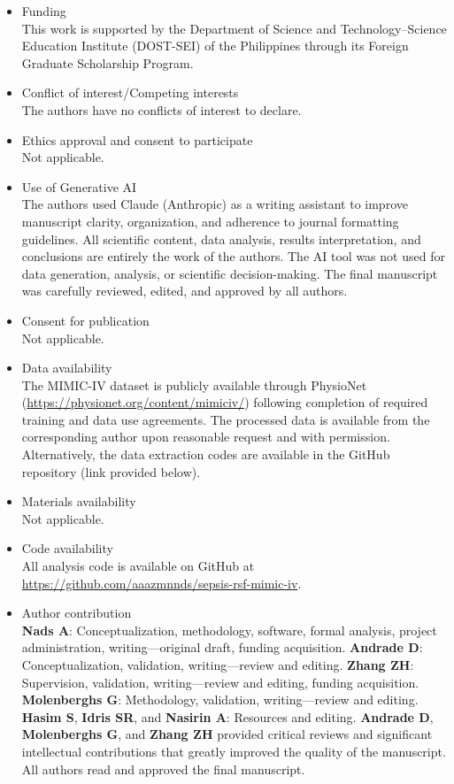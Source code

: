 \documentclass[pdflatex,sn-mathphys-num]{sn-jnl}%
\theoremstyle{thmstyleone}%
\theoremstyle{thmstyletwo}%
\theoremstyle{thmstylethree}%
\begin{document}
\begin{itemize}
\item Funding \\ This work is supported by the Department of Science and Technology--Science Education Institute (DOST-SEI) of the Philippines through its Foreign Graduate Scholarship Program.
\item Conflict of interest/Competing interests \\ The authors have no conflicts of interest to declare. 
\item Ethics approval and consent to participate \\ Not applicable.
\item Use of Generative AI \\ The authors used Claude (Anthropic) as a writing assistant to improve manuscript clarity, organization, and adherence to journal formatting guidelines. All scientific content, data analysis, results interpretation, and conclusions are entirely the work of the authors. The AI tool was not used for data generation, analysis, or scientific decision-making. The final manuscript was carefully reviewed, edited, and approved by 
all authors.
\item Consent for publication \\ Not applicable.
\item Data availability \\ The MIMIC-IV dataset is publicly available through PhysioNet (\url{https://physionet.org/content/mimiciv/}) following completion of required training and data use agreements. The processed data is available from the corresponding author upon reasonable request and with permission. Alternatively, the data extraction codes are available in the GitHub repository (link provided below).
\item Materials availability \\ Not applicable.
\item Code availability \\ All analysis code is available on GitHub at \url{https://github.com/aaazmnnds/sepsis-rsf-mimic-iv}.
\item Author contribution \\ \textbf{Nads A}: Conceptualization, methodology, software, formal analysis, project administration, writing---original draft, funding acquisition. \textbf{Andrade D}: Conceptualization, validation, writing---review and editing. \textbf{Zhang ZH}: Supervision, validation, writing---review and editing, funding acquisition. \textbf{Molenberghs G}: Methodology, validation, writing---review and editing. \textbf{Hasim S}, \textbf{Idris SR}, and \textbf{Nasirin A}: Resources and editing. \textbf{Andrade D}, \textbf{Molenberghs G}, and \textbf{Zhang ZH} provided critical reviews and significant intellectual contributions that greatly improved the quality of the manuscript. All authors read and approved the final manuscript.
\end{itemize}
\end{document}
